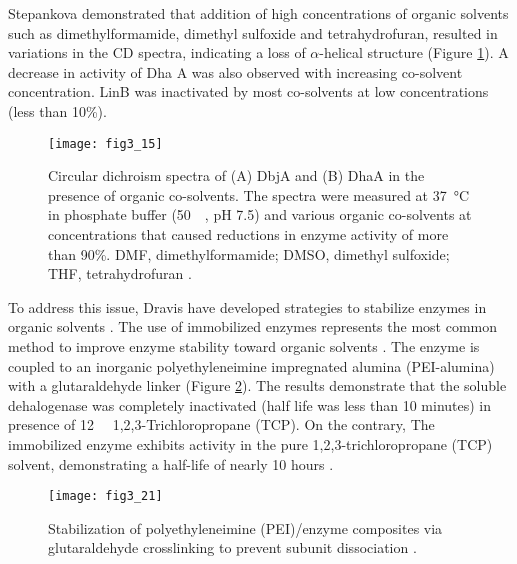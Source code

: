\begin{refsection}
Stepankova  demonstrated that addition of high concentrations of
organic solvents such as dimethylformamide, dimethyl sulfoxide and
tetrahydrofuran, resulted in variations in the CD spectra, indicating a loss of
$\alpha$-helical structure \cite{Stepankova2013a} (Figure
\ref{fig:organic-effect}). A decrease in activity of Dha A was also observed
with increasing co-solvent concentration. LinB was inactivated by most
co-solvents at low concentrations (less than 10\%).
\begin{figure}[htbp] \centering \texttt{[image: fig3\_15]} 
    \caption[Circular dichroism spectra of (A) DbjA and (B) DhaA in the
    presence of organic co-solvents. The spectra were measured at
\SI{37}{\celsius} in phosphate buffer (\SI{50}{\milli\Molar}, pH 7.5) and
various organic co-solvents at concentrations that caused reductions in enzyme
activity of more than 90\%. DMF, dimethylformamide; DMSO, dimethyl sulfoxide;
THF, tetrahydrofuran.]{Circular dichroism spectra of (A) DbjA and (B) DhaA in
    the presence of organic co-solvents. The spectra were measured at
    \SI{37}{\celsius} in phosphate buffer (\SI{50}{\milli\Molar}, pH 7.5) and
    various organic co-solvents at concentrations that caused reductions in
    enzyme activity of more than 90\%. DMF, dimethylformamide; DMSO, dimethyl
    sulfoxide; THF, tetrahydrofuran \cite{Stepankova2013a}.}
    \label{fig:organic-effect} 
\end{figure}

To address this issue, Dravis  have developed strategies to
stabilize enzymes in organic solvents \cite{Dravis2001}. The use of immobilized
enzymes represents the most common method to improve enzyme stability toward
organic solvents \cite{Koudelakova2013,Dravis2001}. The enzyme is coupled to an
inorganic polyethyleneimine impregnated alumina (PEI-alumina) with a
glutaraldehyde linker (Figure \ref{fig:pei}). The results demonstrate that the
soluble dehalogenase was completely inactivated (half life was less than 10
minutes) in presence of \SI{12}{\milli\Molar} 1,2,3-Trichloropropane (TCP). On
the contrary, The immobilized enzyme exhibits activity in the pure
1,2,3-trichloropropane (TCP) solvent, demonstrating a half-life of nearly 10
hours \cite{Dravis2001}.
\begin{figure}[htbp] \centering \texttt{[image: fig3\_21]}
    \caption[Stabilization of polyethyleneimine(PEI)/enzyme composites via
    glutaraldehyde crosslinking to prevent subunit dissociation.]{Stabilization
    of polyethyleneimine (PEI)/enzyme composites via glutaraldehyde
    crosslinking to prevent subunit dissociation \cite{Barbosa2014}.}
    \label{fig:pei}
\end{figure}


\end{refsection}
